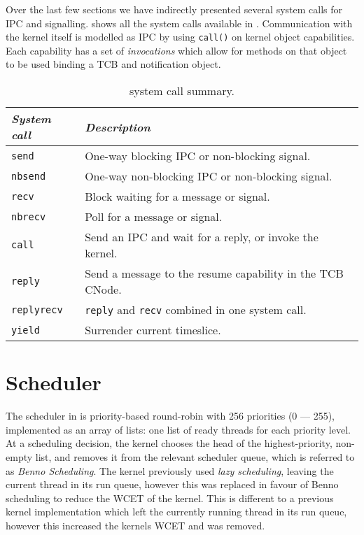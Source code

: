 Over the last few sections we have indirectly presented several system calls for \gls{IPC} and
signalling.  shows all the system calls available in \selfour. Communication
with the kernel itself is modelled as \gls{IPC} by using \texttt{call()} on kernel object
capabilities. Each capability has a set of \emph{invocations} which allow for methods on that object
to be used \eg binding a \gls{TCB} and notification object.

\begin{table} 
    \centering
    \begin{tabular}{lp{}}\toprule
        \emph{System call} & \emph{Description} \\\midrule
        \texttt{send}      & One-way blocking \gls{IPC} or non-blocking signal.\\
        \texttt{nbsend}    & One-way non-blocking \gls{IPC} or non-blocking signal.\\
        \texttt{recv}      & Block waiting for a message or signal. \\
        \texttt{nbrecv}    & Poll for a message or signal. \\
        \texttt{call}      & Send an IPC and wait for a reply, or invoke the kernel. \\
        \texttt{reply}     & Send a message to the resume capability in the TCB CNode.\\
        \texttt{replyrecv} & \texttt{reply} and \texttt{recv} combined in one system call.\\
        \texttt{yield}     & Surrender current timeslice. \\
        \bottomrule
    \end{tabular}
    \caption{\selfour system call summary.}
    \label{t:system-calls}
\end{table}


\section{Scheduler}

The scheduler in \selfour is priority-based round-robin with 256 priorities (0 --- 255), implemented as an array of lists: one list of ready threads for each priority level. 
At a scheduling decision, the kernel chooses the head of the highest-priority, non-empty list, and
removes it from the relevant scheduler queue, which is referred to as \emph{Benno Scheduling}.
The kernel previously used \emph{lazy scheduling}, leaving the current thread in its run queue, however this was replaced in favour of Benno scheduling to reduce the WCET of the kernel. 
This is different to a previous kernel implementation which left the currently running thread in its run queue, however this increased the kernels \gls{WCET} and was removed.

